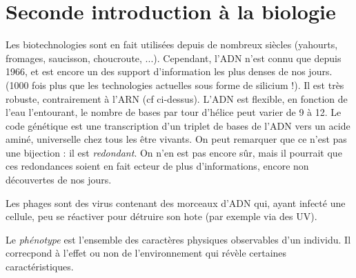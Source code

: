 \documentclass{article}
\begin{document}
\section{Seconde introduction à la biologie}
Les biotechnologies sont en fait utilisées depuis de nombreux siècles (yahourts, fromages, saucisson, choucroute, ...). Cependant, l'ADN n'est connu que depuis 1966, et est encore un des support d'information les plus denses de nos jours. (1000 fois plus que les technologies actuelles sous forme de silicium !). Il est très robuste, contrairement à l'ARN (cf ci-dessus). L'ADN est flexible, en fonction de l'eau l'entourant, le nombre de bases par tour d'hélice peut varier de 9 à 12. Le code génétique est une transcription d'un triplet de bases de l'ADN vers un acide aminé, universelle chez tous les être vivants. On peut remarquer que ce n'est pas une bijection : il est \emph{redondant}. On n'en est pas encore sûr, mais il pourrait que ces redondances soient en fait ecteur de plus d'informations, encore non découvertes de nos jours.


Les phages sont des virus contenant des morceaux d'ADN qui, ayant infecté une cellule, peu se réactiver pour détruire son hote (par exemple via des UV).


Le \emph{phénotype} est l'ensemble des caractères physiques observables d'un individu. Il correcpond à l'effet ou non de l'environnement qui révèle certaines caractéristiques.
\end{document}
